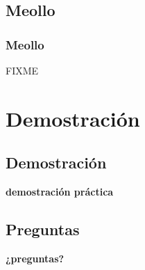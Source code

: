 \documentclass[spanish]{beamer}
\begin{document}
\subsection{Meollo}
\frame
{
  \frametitle{Meollo}

  FIXME
}

\section{Demostración}
\subsection{Demostración}
\frame
{
  \begin{center}
    \LARGE{\textbf{demostración práctica}}
  \end{center}
}
\subsection{Preguntas}
\frame
{
  \begin{center}
    \LARGE{\textbf{¿preguntas?}}
  \end{center}
}
\end{document}
